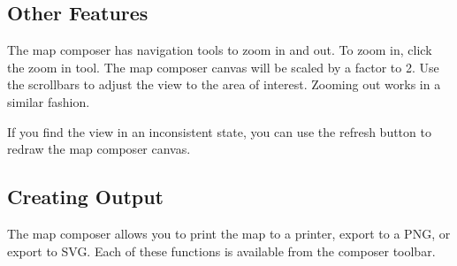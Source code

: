 \subsection{Other Features}
The map composer has navigation tools to zoom in and out. To zoom in, click
the zoom in tool. The map composer canvas will be scaled by a factor to 2. Use
the scrollbars to adjust the view to the area of interest. Zooming out works
in a similar fashion.

If you find the view in an inconsistent state, you can use the refresh button
to redraw the map composer canvas.

\subsection{Creating Output}
The map composer allows you to print the map to a printer, export to a PNG, or
export to SVG. Each of these functions is available from the composer toolbar.

